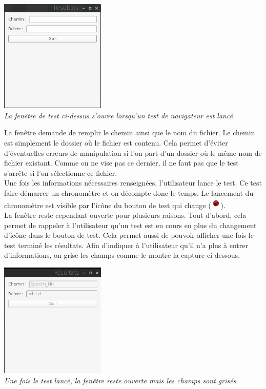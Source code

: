 \documentclass[a4paper, 11pt]{report}
\begin{document}
		\begin{center}
			\includegraphics[width=5cm]{test}\\
			\emph{La fenêtre de test ci-dessus s'ouvre lorsqu'un test de navigateur est lancé.\\}
		\end{center}
		
		La fenêtre demande de remplir le chemin ainsi que le nom du fichier. Le chemin est simplement le dossier où le fichier est contenu. Cela permet d'éviter d'éventuelles erreurs de manipulation si l'on part d'un dossier où le même nom de fichier existant. Comme on ne vise pas ce dernier, il ne faut pas que le test s'arrête si l'on sélectionne ce fichier.\\
		Une fois les informations nécessaires renseignées, l'utilisateur lance le test. Ce test faire démarrer un chronomètre et on décompte donc le temps. Le lancement du chronomètre est visible par l'icône du bouton de test qui change (\includegraphics[width=0.5cm]{stop}).\\
		La fenêtre reste cependant ouverte pour plusieurs raisons. Tout d'abord, cela permet de rappeler à l'utilisateur qu'un test est en cours en plus du changement d'icône dans le bouton de test. Cela permet aussi de pouvoir afficher une fois le test terminé les résultats. Afin d'indiquer à l'utilisateur qu'il n'a plus à entrer d'informations, on grise les champs comme le montre la capture ci-dessous.\\
		
		\begin{center}
			\includegraphics[width=5cm]{test_run}\\
			\emph{Une fois le test lancé, la fenêtre reste ouverte mais les champs sont grisés.\\}
		\end{center}
		
\end{document}
